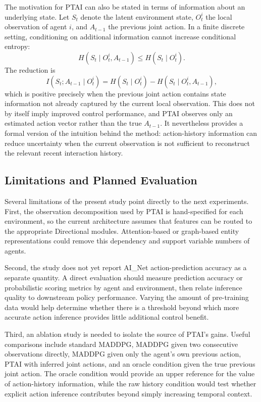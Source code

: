 \documentclass[12pt]{article}
\begin{document}
The motivation for PTAI can also be stated in terms of information about an underlying
state. Let $S_t$ denote the latent environment state, $O_t^i$ the local observation of
agent $i$, and $A_{t-1}$ the previous joint action. In a finite discrete setting,
conditioning on additional information cannot increase conditional entropy:
\begin{equation}
H(S_t \mid O_t^i, A_{t-1}) \leq H(S_t \mid O_t^i).
\end{equation}
The reduction is
\begin{equation}
I(S_t; A_{t-1} \mid O_t^i)
= H(S_t \mid O_t^i) - H(S_t \mid O_t^i, A_{t-1}),
\end{equation}
which is positive precisely when the previous joint action contains state information not
already captured by the current local observation. This does not by itself imply improved
control performance, and PTAI observes only an estimated action vector rather than the
true $A_{t-1}$. It nevertheless provides a formal version of the intuition behind the
method: action-history information can reduce uncertainty when the current observation is
not sufficient to reconstruct the relevant recent interaction history.

\subsection{Limitations and Planned Evaluation}

Several limitations of the present study point directly to the next experiments.
First, the observation decomposition used by PTAI is hand-specified for each environment,
so the current architecture assumes that features can be routed to the appropriate
Directional modules. Attention-based or graph-based entity representations could remove
this dependency and support variable numbers of agents.

Second, the study does not yet report AI\_Net action-prediction accuracy as a separate
quantity. A direct evaluation should measure prediction accuracy or probabilistic scoring
metrics by agent and environment, then relate inference quality to downstream policy
performance. Varying the amount of pre-training data would help determine whether there is
a threshold beyond which more accurate action inference provides little additional control
benefit.

Third, an ablation study is needed to isolate the source of PTAI's gains. Useful
comparisons include standard MADDPG, MADDPG given two consecutive observations directly,
MADDPG given only the agent's own previous action, PTAI with inferred joint actions, and
an oracle condition given the true previous joint action. The oracle condition would
provide an upper reference for the value of action-history information, while the raw
history condition would test whether explicit action inference contributes beyond simply
increasing temporal context.
\end{document}
